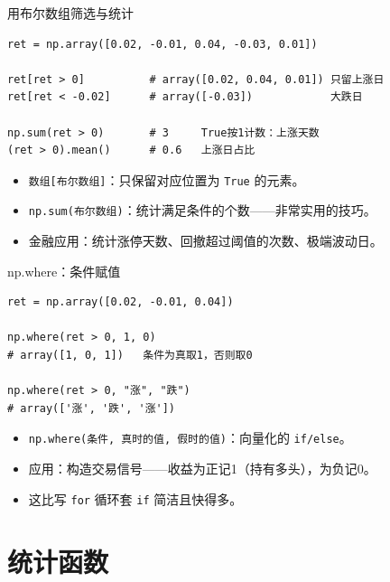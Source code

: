 \documentclass[9pt]{ctexbeamer}
\begin{document}
\begin{frame}[fragile]{用布尔数组筛选与统计}
	\begin{lstlisting}
ret = np.array([0.02, -0.01, 0.04, -0.03, 0.01])

ret[ret > 0]          # array([0.02, 0.04, 0.01]) 只留上涨日
ret[ret < -0.02]      # array([-0.03])            大跌日

np.sum(ret > 0)       # 3     True按1计数：上涨天数
(ret > 0).mean()      # 0.6   上涨日占比
\end{lstlisting}
	\begin{itemize}
		\item \texttt{数组[布尔数组]}：只保留对应位置为 \texttt{True} 的元素。
		\item \texttt{np.sum(布尔数组)}：统计满足条件的个数——非常实用的技巧。
		\item 金融应用：统计涨停天数、回撤超过阈值的次数、极端波动日。
	\end{itemize}
\end{frame}

\begin{frame}[fragile]{np.where：条件赋值}
	\begin{lstlisting}
ret = np.array([0.02, -0.01, 0.04])

np.where(ret > 0, 1, 0)
# array([1, 0, 1])   条件为真取1，否则取0

np.where(ret > 0, "涨", "跌")
# array(['涨', '跌', '涨'])
\end{lstlisting}
	\begin{itemize}
		\item \texttt{np.where(条件, 真时的值, 假时的值)}：向量化的 \texttt{if/else}。
		\item 应用：构造交易信号——收益为正记1（持有多头），为负记0。
		\item 这比写 \texttt{for} 循环套 \texttt{if} 简洁且快得多。
	\end{itemize}
\end{frame}


\section{统计函数}
\end{document}

